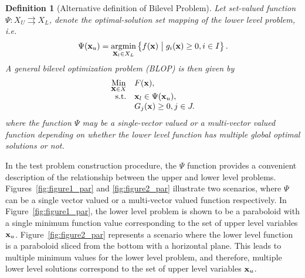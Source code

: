 \documentclass[twoside]{article}
\def\argmin{\mathop{\rm argmin}\limits}
\def\tos{\rightrightarrows}
\newtheorem{definition}[theorem]{Definition}
\begin{document}
\vskip 0.2cm
\begin{definition}[Alternative definition of Bilevel Problem] Let set-valued function $\Psi:X_U\tos X_L$, denote the optimal-solution set mapping of the lower level problem, i.e.
$$
\Psi(\boldx_u)=\underset{\boldx_l\in X_L}{\argmin}\left\lbrace f(\boldx) \hspace{1mm}\big|\hspace{1mm} g_i(\boldx) \geq 0, i\in I \right\rbrace.
$$ 
A general bilevel optimization problem (BLOP) is then given by
\begin{equation}
\begin{array}{rl}
\underset{{\mbox{$\mathbf{x}$}\in X}}{\mbox{Min}} & F(\mbox{$\mathbf{x}$}), \\
\mbox{s.t.} & 
\mbox{$\mathbf{x}$}_l \in \Psi(\mbox{$\mathbf{x}$}_u), \\
& G_j(\mbox{$\mathbf{x}$})\geq 0, j\in J.
\end{array} 
\label{eq:bilevel_multi_obj2}
\end{equation}
where the function $\Psi$ may be a single-vector valued or a multi-vector valued function depending on whether the lower level function has multiple global optimal solutions or not.
\end{definition}
\vskip 0.2cm

In the test problem construction procedure, the $\Psi$ function provides a convenient description of the relationship between the upper and lower level problems. Figures~\ref{fig:figure1_par} and \ref{fig:figure2_par} illustrate two scenarios, where $\Psi$ can be a single vector valued or a multi-vector valued function respectively. In Figure~\ref{fig:figure1_par}, the lower level problem is shown to be a paraboloid with a single minimum function value corresponding to the set of upper level variables $\mbox{$\mathbf{x}$}_u$. Figure~\ref{fig:figure2_par} represents a scenario where the lower level function is a paraboloid sliced from the bottom with a horizontal plane. This leads to multiple minimum values for the lower level problem, and therefore, multiple lower level solutions correspond to the set of upper level variables $\mbox{$\mathbf{x}$}_u$.

\begin{figure*}
\begin{minipage}[t]{0.49\linewidth}
\begin{center}
\end{center}
\caption{Relationship between upper and lower level variables in case of a single-vector valued mapping. For simplicity the lower level function has the shape of a paraboloid.}
\label{fig:figure1_par}
\end{minipage}\hfill
\begin{minipage}[t]{0.49\linewidth}
\begin{center}
\end{center}
\caption{Relationship between upper and lower level variables in case of a multi-vector valued mapping. The lower level function is shown in the shape of a paraboloid with the bottom sliced with a plane.}
\label{fig:figure2_par}
\end{minipage}
\end{figure*}
\end{document}
